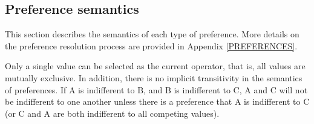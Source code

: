 \subsection{Preference semantics}
\label{ARCH-prefmem-semantics}

This section describes the semantics of each type of preference.  More
details on the preference resolution process are provided in
Appendix
\ref{PREFERENCES}.


Only a single value can be selected as the current operator, that is,
all values are mutually exclusive.  In addition, there is no implicit
transitivity in the semantics of preferences.  If A is indifferent to B,
and B is indifferent to C, A and C will not be indifferent to one
another unless there is a preference that A is indifferent to C (or C
and A are both indifferent to all competing values).

